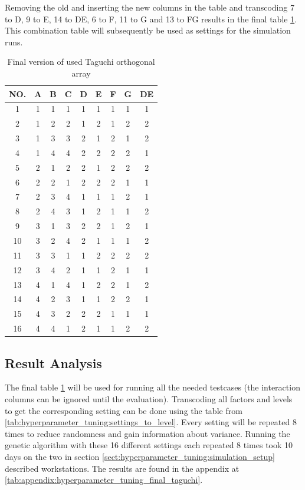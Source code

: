 Removing the old and inserting the new columns in the table and transcoding 7 to D, 9 to E, 14 to DE, 6 to F, 11 to G and 13 to FG results in the final table \ref{tab:hyperparameter_tuning:final_taguchi}.
This combination table will subsequently be used as settings for the simulation runs.

\begin{table}[ht]
	\centering
	\begin{tabular}{ |c||c|c|c|c|c|c|c|c|  }
		\hline
		NO.& A & B & C & D & E & F & G & DE\\
		\hline
		1  & 1 & 1 & 1 & 1 & 1 & 1 & 1 & 1\\
		2  & 1 & 2 & 2 & 1 & 2 & 1 & 2 & 2\\
		3  & 1 & 3 & 3 & 2 & 1 & 2 & 1 & 2\\
		4  & 1 & 4 & 4 & 2 & 2 & 2 & 2 & 1\\
		5  & 2 & 1 & 2 & 2 & 1 & 2 & 2 & 2\\
		6  & 2 & 2 & 1 & 2 & 2 & 2 & 1 & 1\\
		7  & 2 & 3 & 4 & 1 & 1 & 1 & 2 & 1\\
		8  & 2 & 4 & 3 & 1 & 2 & 1 & 1 & 2\\
		9  & 3 & 1 & 3 & 2 & 2 & 1 & 2 & 1\\
		10 & 3 & 2 & 4 & 2 & 1 & 1 & 1 & 2\\
		11 & 3 & 3 & 1 & 1 & 2 & 2 & 2 & 2\\
		12 & 3 & 4 & 2 & 1 & 1 & 2 & 1 & 1\\
		13 & 4 & 1 & 4 & 1 & 2 & 2 & 1 & 2\\
		14 & 4 & 2 & 3 & 1 & 1 & 2 & 2 & 1\\
		15 & 4 & 3 & 2 & 2 & 2 & 1 & 1 & 1\\
		16 & 4 & 4 & 1 & 2 & 1 & 1 & 2 & 2\\
		\hline
	\end{tabular}
	\caption{Final version of used Taguchi orthogonal array}
	\label{tab:hyperparameter_tuning:final_taguchi}
\end{table}


\subsection{Result Analysis}
\label{sect:hyperparameter_tuning:analysis_of_results}
The final table \ref{tab:hyperparameter_tuning:final_taguchi} will be used for running all the needed testcases (the interaction columns can be ignored until the evaluation). Transcoding all factors and levels to get the corresponding setting can be done using the table from \ref{tab:hyperparameter_tuning:settings_to_level}. Every setting will be repeated 8 times to reduce randomness and gain information about variance. 
Running the genetic algorithm with these 16 different settings each repeated 8 times took 10 days on the two in section \ref{sect:hyperparameter_tuning:simulation_setup} described workstations. The results are found in the appendix at \ref{tab:appendix:hyperparameter_tuning_final_taguchi}.

